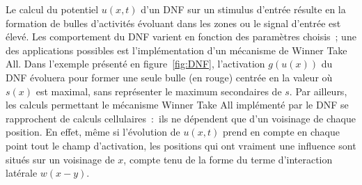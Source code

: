 \documentclass[../main]{subfiles}
\begin{document}
Le calcul du potentiel $u(x,t)$ d'un DNF sur un stimulus d'entrée résulte en la formation de bulles d'activités évoluant dans les zones ou le signal d'entrée est élevé.
Les comportement du DNF varient en fonction des paramètres choisis~; une des applications possibles est l'implémentation d'un mécanisme de Winner Take All. 
Dans l'exemple présenté en figure~\ref{fig:DNF}, l'activation $g(u(x))$ du DNF évoluera pour former une seule bulle (en rouge) centrée en la valeur où $s(x)$ est maximal, sans représenter le maximum secondaires de $s$.
Par ailleurs, les calculs permettant le mécanisme Winner Take All implémenté par le DNF se rapprochent de calculs cellulaires~:~ils ne dépendent que d'un voisinage de chaque position.
En effet, même si l'évolution de $u(x,t)$ prend en compte en chaque point tout le champ d'activation, les positions qui ont vraiment une influence sont situés sur un voisinage de $x$, compte tenu de la forme du terme d'interaction latérale $w(x-y)$.
\end{document}
